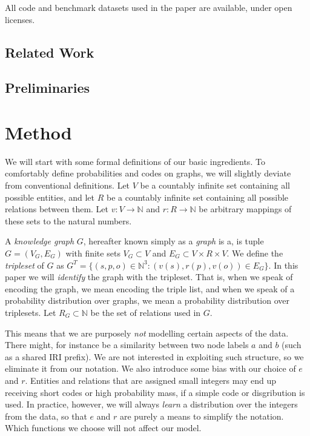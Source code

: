 \documentclass[11pt]{article}
\newcommand{\N}{{\mathbb N}}
\begin{document}
All code and benchmark datasets used in the paper are available, under open licenses.\footnotemark



\subsection{Related Work}

\subsection{Preliminaries}


\section{Method}

We will start with some formal definitions of our basic ingredients. To comfortably define probabilities and codes on graphs, we will slightly deviate from conventional definitions. Let $V$ be a countably infinite set containing all possible entities, and let $R$ be a countably infinite set containing all possible relations between them. Let $v: V \to \N$ and $r: R \to \N$ be arbitrary mappings of these sets to the natural numbers.\footnotemark



A \emph{knowledge graph} $G$, hereafter known simply as a \emph{graph} is a, is tuple $G = (V_G, E_G)$ with finite sets $V_G \subset V$ and $E_G \subset V \times R \times V$. We define the \emph{tripleset} of $G$ as $G^T = \{(s, p, o) \in \N^3 : \left (v(s), r(p), v(o) \right ) \in E_G\}$. In this paper we will \emph{identify} the graph with the tripleset. That is, when we speak of encoding the graph, we mean encoding the triple list, and when we speak of a probability distribution over graphs, we mean a probability distribution over triplesets. Let $R_G \subset \N$ be the set of relations used in $G$. 

This means that we are purposely \emph{not} modelling certain aspects of the data. There might, for instance be a similarity between two node labels $a$ and $b$ (such as a shared IRI prefix). We are not interested in exploiting such structure, so we eliminate it from our notation. We also introduce some bias with our choice of $e$ and $r$. Entities and relations that are assigned small integers may end up receiving short codes or high probability mass, if a simple code or disgribution is used. In practice, however, we will always \emph{learn} a distribution over the integers from the data, so that $e$ and $r$ are purely a means to simplify the notation. Which functions we choose will not affect our model.
\end{document}
